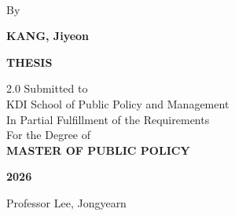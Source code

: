 \begin{titlepage}
\singlespacing
\begin{center}
\vspace*{2.2cm}
{\fontsize{13}{20}\selectfont\bfseries
 \makebox[\textwidth][c]{\thesistitleA}\\
 \makebox[\textwidth][c]{\thesistitleB}\par}
\vspace{2.2cm}
By\par
\vspace{0.3cm}
{\bfseries KANG, Jiyeon\par}
\vspace{2.8cm}
{\bfseries THESIS\par}
\vspace{1cm}
\begin{spacing}{2.0}
Submitted to\\
KDI School of Public Policy and Management\\
In Partial Fulfillment of the Requirements\\
For the Degree of\\
{\bfseries MASTER OF PUBLIC POLICY}
\end{spacing}
\vspace{1.6cm}
{\large\bfseries 2026\par}
\vspace{0.6cm}
Professor Lee, Jongyearn\par
\end{center}
\end{titlepage}

